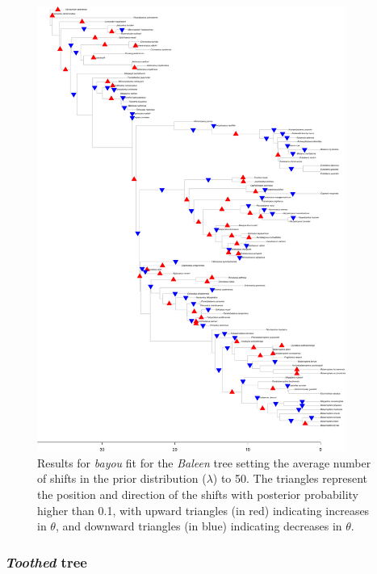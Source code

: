 \begin{figure}[H]
\includegraphics[width=0.9\textwidth]{img/plots-baleen-wZBL-k50-1.pdf}
\caption{Results for \textit{bayou} fit for the \textit{Baleen} tree setting the average number of shifts in the prior distribution ($\lambda$) to 50. The triangles represent the position and direction of the shifts with posterior probability higher than 0.1, with upward triangles (in red) indicating increases in $\theta$, and downward triangles (in blue) indicating decreases in $\theta$.}
\label{fig:baleen-k50}
\end{figure}

\subsubsection{\textit{Toothed} tree}

